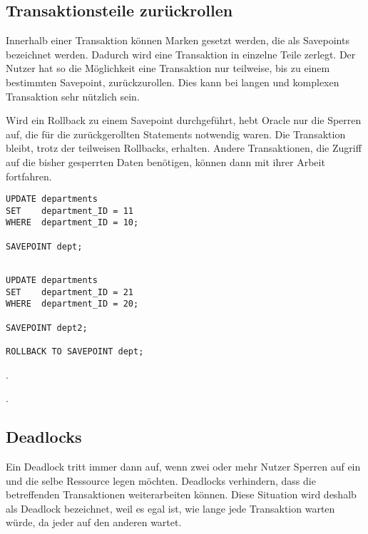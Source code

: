       \subsection{Transaktionsteile zur\"uckrollen}
        Innerhalb einer Transaktion k\"onnen Marken gesetzt werden, die als Savepoints bezeichnet werden. Dadurch wird eine Transaktion in einzelne Teile zerlegt. Der Nutzer hat so die M\"oglichkeit eine Transaktion nur teilweise, bis zu einem bestimmten Savepoint, zur\"uckzurollen. Dies kann bei langen und komplexen Transaktion sehr n\"utzlich sein.

        Wird ein Rollback zu einem Savepoint durchgef\"uhrt, hebt Oracle nur die Sperren auf, die f\"ur die zur\"uckgerollten Statements notwendig waren. Die Transaktion bleibt, trotz der teilweisen Rollbacks, erhalten. Andere Transaktionen, die Zugriff auf die bisher gesperrten Daten ben\"otigen, k\"onnen dann mit ihrer Arbeit fortfahren.

        \begin{lstlisting}[caption={Einen Savepoint setzen},label=admin403,language=oracle_sql]
UPDATE departments
SET    department_ID = 11
WHERE  department_ID = 10;

SAVEPOINT dept;
        \end{lstlisting}
        \begin{lstlisting}[caption={Rollback zu einem Savepoint},label=admin404,language=oracle_sql]
        
UPDATE departments
SET    department_ID = 21
WHERE  department_ID = 20;

SAVEPOINT dept2;

ROLLBACK TO SAVEPOINT dept;
        \end{lstlisting}
        \begin{literaturinternet}
          \item \cite[Konkurrierende Zugriffe und Datenkonsistenz]{dataconcurrencyandconsistency}.
          \item \cite[Transaktionsverwaltung]{transactionmanagement}.
        \end{literaturinternet}
      \subsection{Deadlocks}
        Ein Deadlock tritt immer dann auf, wenn zwei oder mehr Nutzer Sperren auf ein und die selbe Ressource legen m\"ochten. Deadlocks verhindern, dass die betreffenden Transaktionen weiterarbeiten k\"onnen. Diese Situation wird deshalb als Deadlock bezeichnet, weil es egal ist, wie lange jede Transaktion warten w\"urde, da jeder auf den anderen wartet.

